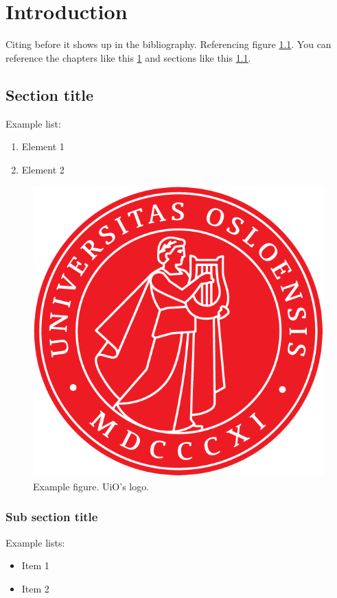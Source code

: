 \chapter{Introduction} \label{ch:introduction}
Citing \cite{einstein} before it shows up in the bibliography. Referencing figure \ref{fig:uio_logo}. You can reference the chapters like this \ref{ch:introduction} and sections like this \ref{sec:section}.

\newpage
\section{Section title} \label{sec:section}
Example list:
\begin{enumerate}
    \item Element 1
    \item Element 2
\end{enumerate}

\begin{figure} 
    \centering
    \includegraphics[scale=2.5]{DUO_UiO_segl.png}
    \caption{Example figure. UiO's logo.}
    \label{fig:uio_logo}
\end{figure}

\newpage 

\subsection{Sub section title}
Example lists:
\begin{itemize}
    \item Item 1
    \item Item 2
\end{itemize}


